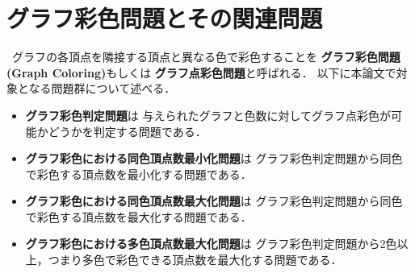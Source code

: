 \chapter{グラフ彩色問題とその関連問題}

\, グラフの各頂点を隣接する頂点と異なる色で彩色することを
\textbf{グラフ彩色問題(Graph Coloring)}もしくは
\textbf{グラフ点彩色問題}と呼ばれる．
以下に本論文で対象となる問題群について述べる．

\begin{itemize}
\item \textbf{グラフ彩色判定問題}は
  与えられたグラフと色数に対してグラフ点彩色が可能かどうかを判定する問題である．
\item \textbf{グラフ彩色における同色頂点数最小化問題}は
  グラフ彩色判定問題から同色で彩色する頂点数を最小化する問題である．
\item \textbf{グラフ彩色における同色頂点数最大化問題}は
  グラフ彩色判定問題から同色で彩色する頂点数を最大化する問題である．
\item \textbf{グラフ彩色における多色頂点数最大化問題}は
  グラフ彩色判定問題から2色以上，つまり多色で彩色できる頂点数を最大化する問題である．
\end{itemize}


